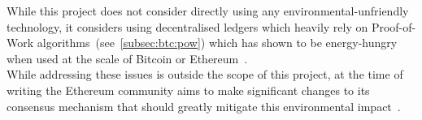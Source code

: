 While this project does not consider directly using any environmental-unfriendly technology, it considers using
decentralised ledgers which heavily rely on Proof-of-Work algorithms~(see~\ref{subsec:btc:pow}) which has shown
to be energy-hungry when used at the scale of Bitcoin or Ethereum~\cite{GOODKIND2020101281}.\\

While addressing these issues is outside the scope of this project, at the time of writing the Ethereum community aims
to make significant changes to its consensus mechanism that should greatly mitigate this environmental
impact~\cite{eth2Vision}.

